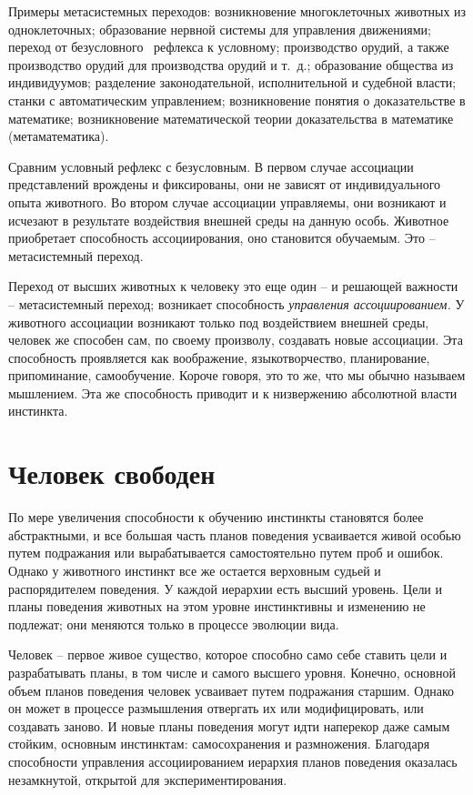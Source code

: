 \documentclass{book}
\begin{document}
Примеры метасистемных переходов: возникновение много­клеточных животных из одноклеточных; образование нерв­ной системы для 
управления движениями; переход от безус­ловного  рефлекса к условному; производство орудий, а также производство орудий для 
производства орудий и т.~д.; образование общества из индивидуумов; разделение законо­дательной, исполнительной и судебной власти; 
станки с авто­матическим управлением; возникновение понятия о доказа­тельстве в математике; возникновение математической теории 
доказательства в математике (метаматематика).

Сравним условный рефлекс с безусловным. В первом случае ассоциации представлений врождены и фиксированы, они не зависят от 
индивидуального опыта животного. Во втором случае ассоциации управляемы,  они возникают и исчезают в результате воздействия 
внешней среды на данную особь. Животное приобретает способность ассоциирования,  оно становит­ся обучаемым. Это -- метасистемный 
переход.

Переход от высших животных к человеку это еще один -- и решающей важности -- метасистемный переход; возникает способность 
\textit{управления ассоциированием.}  У животного ассоциации возникают только под воздействием внешней среды, человек же 
способен сам, по своему произволу, создавать новые ассоциации. Эта способность проявляется как воображение, языкотворчество, 
планирование, припоминание, самообучение. Короче говоря, это то же, что мы обычно называем мышлением.  Эта же способность 
приводит и к низвержению абсолютной власти инстинкта.


\section{Человек свободен}

По мере увеличения способности к обучению инстинкты становятся более абстрактными, и все большая часть планов поведения 
усваивается живой особью путем подражания или вырабатывается самостоятельно путем проб и ошибок. Однако у животного инстинкт все 
же остается верховным судьей и распорядителем поведения. У каждой иерархии есть высший уровень. Цели и планы поведения животных 
на этом уровне инстинктивны и изменению не подлежат; они меняются только в процессе эволюции вида.

Человек -- первое живое существо, которое способно само себе ставить цели и разрабатывать планы, в том числе и самого высшего 
уровня. Конечно, основной объем планов поведения человек усваивает путем подражания старшим. Однако он мо­жет в процессе 
размышления отвергать их или модифициро­вать, или создавать заново. И новые планы поведения могут идти наперекор даже самым 
стойким, основным инстинктам: самосохранения и размножения. Благодаря способности управ­ления ассоциированием иерархия планов 
поведения оказалась незамкнутой, открытой для экспериментирования.
\end{document}
